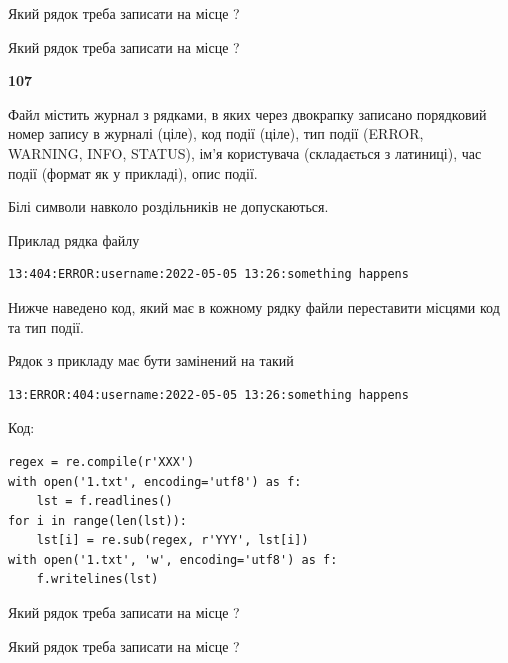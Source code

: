 Який рядок треба записати на місце  ?\par
\vspace{5mm}


Який рядок треба записати на місце  ?\par


\newpage

{\begin {center}\textbf{ 107}\end {center}}\par
Файл  містить журнал з рядками, в яких через двокрапку записано поряд\-ко\-вий номер запису в журналі (ціле), код події (ціле), тип події (ERROR,\\ WARNING, INFO, STATUS), ім'я користувача (складається з латиниці), час події (фор\-мат як у прикладі), опис події.

Білі символи навколо роздільників не допускаються.

Приклад рядка файлу



\begin{verbatim}
13:404:ERROR:username:2022-05-05 13:26:something happens
\end{verbatim}


Нижче наведено код, який має в кожному рядку файли переставити місцями код та тип події.

Рядок з прикладу має бути замінений на такий



\begin{verbatim}
13:ERROR:404:username:2022-05-05 13:26:something happens
\end{verbatim}




Код:



\begin{verbatim}
regex = re.compile(r'XXX')
with open('1.txt', encoding='utf8') as f:
    lst = f.readlines()
for i in range(len(lst)):
    lst[i] = re.sub(regex, r'YYY', lst[i])
with open('1.txt', 'w', encoding='utf8') as f:
    f.writelines(lst)
\end{verbatim}







Який рядок треба записати на місце  ?\par
\vspace{5mm}


Який рядок треба записати на місце  ?\par


